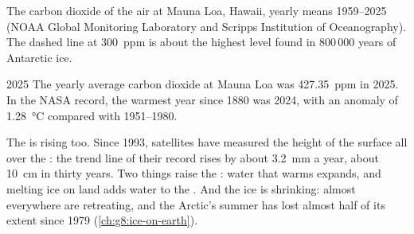 \begin{omfigure}

{\small The carbon dioxide of the air at Mauna Loa, Hawaii, yearly means
1959--2025 (NOAA Global Monitoring Laboratory and Scripps Institution of
Oceanography). The dashed line at \qty{300}{ppm} is about the highest
level found in 800\,000 years of Antarctic ice.}
\label{fig:g9:climate-past-and-present:co2}
\end{omfigure}

\begin{dated}{2025}
The yearly average carbon dioxide at Mauna Loa was \qty{427.35}{ppm} in
2025. In the NASA record, the warmest year since 1880 was 2024, with an
anomaly of \qty{1.28}{\degreeCelsius} compared with 1951--1980.
\end{dated}

The  is rising too. Since 1993, satellites have measured the height
of the  surface all over the : the trend line of their record
rises by about \qty{3.2}{mm} a year, about \qty{10}{cm} in thirty years.
Two things raise the : water that warms expands, and melting ice on
land adds water to the . And the ice is shrinking:  
almost everywhere are retreating, and the Arctic's summer  has lost
almost half of its extent since 1979 (\cref{ch:g8:ice-on-earth}).

